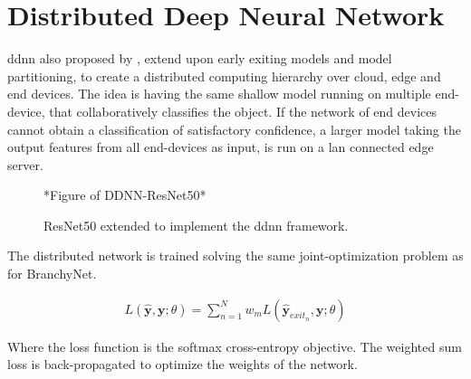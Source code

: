 \section{Distributed Deep Neural Network}

\gls{ddnn} \cite{teerapittayanon_distributed_2017} also proposed by \citeauthor{teerapittayanon_distributed_2017}, extend upon early exiting models and model partitioning,  to  create a distributed computing hierarchy over cloud, edge and end devices. The idea is having the same shallow model running on multiple end-device, that collaboratively classifies the object. If the network of end devices cannot obtain a classification of satisfactory confidence, a larger model taking the output features from all end-devices as input, is run on a \gls{lan} connected edge server. 

\begin{figure}
	*Figure of DDNN-ResNet50*
	\caption[\gls{ddnn}-ResNet architecture]{ResNet50 extended to implement the \gls{ddnn} framework.}
	\label{ddnn-resnet}
\end{figure}

The distributed network is trained solving the same joint-optimization problem as for BranchyNet.

\begin{align*}
L(\hat{\mathbf{y}},\mathbf{y};\theta) = \sum_{n=1}^{N} w_m L(\hat{\mathbf{y}}_{exit_n},\mathbf{y};\theta)
\end{align*}

Where the loss function is the softmax cross-entropy objective.
The weighted sum loss is back-propagated to optimize the weights of the network. 

